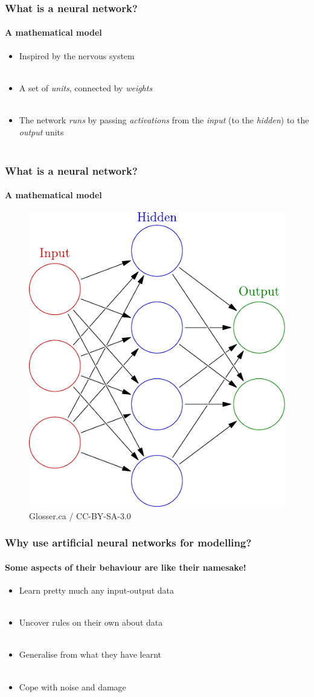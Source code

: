 \documentclass{beamer}
\begin{document}
\begin{frame}
\frametitle{What is a neural network?}
\framesubtitle{A mathematical model}
\begin{itemize}
\item Inspired by the nervous system \\ \
 \item A set of \emph{units}, connected by \emph{weights} \\ \
\item The network \emph{runs} by passing \emph{activations} from the \emph{input} (to the \emph{hidden}) to the \emph{output} units \\ \
\end{itemize}
\end{frame}
\begin{frame}
\frametitle{What is a neural network?}
\framesubtitle{A mathematical model}
\begin{figure}
 \centering
 \includegraphics[width=0.6\linewidth]{./fig/3-layer.pdf}
 \caption{Glosser.ca / CC-BY-SA-3.0}
\end{figure}
\end{frame}




\begin{frame}
\frametitle{Why use artificial neural networks for modelling?}
\framesubtitle{Some aspects of their behaviour are like their namesake!}
\begin{itemize}
\item Learn pretty much any input-output data \\ \
 \item Uncover rules on their own about data  \\ \
\item Generalise from what they have learnt \\ \
\item Cope with noise and damage \\ \
\end{itemize}
\end{frame}
\end{document}
